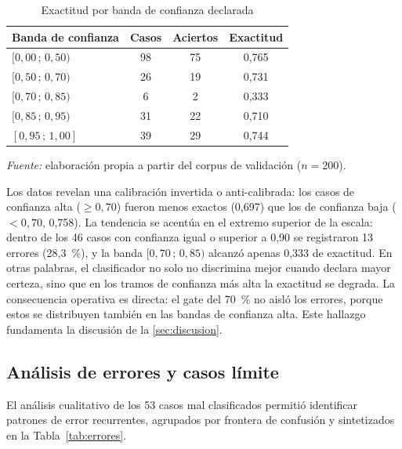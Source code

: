 \begin{table}[htbp]
\centering
\caption{Exactitud por banda de confianza declarada}
\label{tab:bandas}
\small
\begin{tabular}{@{}l c c c@{}}
\toprule
\textbf{Banda de confianza} & \textbf{Casos} & \textbf{Aciertos} & \textbf{Exactitud} \\
\midrule
\([0{,}00\,;\,0{,}50)\) & 98 & 75 & 0,765 \\
\([0{,}50\,;\,0{,}70)\) & 26 & 19 & 0,731 \\
\([0{,}70\,;\,0{,}85)\) & 6  & 2  & 0,333 \\
\([0{,}85\,;\,0{,}95)\) & 31 & 22 & 0,710 \\
\([0{,}95\,;\,1{,}00]\) & 39 & 29 & 0,744 \\
\bottomrule
\end{tabular}
\par\smallskip
{\footnotesize\textit{Fuente:} elaboración propia a partir del corpus de validación (\(n = 200\)).\par}
\end{table}

Los datos revelan una calibración invertida o anti-calibrada: los casos de confianza alta (\(\ge 0{,}70\)) fueron menos exactos (0,697) que los de confianza baja (\(< 0{,}70\), 0,758). La tendencia se acentúa en el extremo superior de la escala: dentro de los 46 casos con confianza igual o superior a 0,90 se registraron 13 errores (28,3~\%), y la banda \([0{,}70\,;\,0{,}85)\) alcanzó apenas 0,333 de exactitud. En otras palabras, el clasificador no solo no discrimina mejor cuando declara mayor certeza, sino que en los tramos de confianza más alta la exactitud se degrada. La consecuencia operativa es directa: el gate del 70~\% no aisló los errores, porque estos se distribuyen también en las bandas de confianza alta. Este hallazgo fundamenta la discusión de la \autoref{sec:discusion}.

\subsection{Análisis de errores y casos límite}\label{subsec:analisis-errores}

El análisis cualitativo de los 53 casos mal clasificados permitió identificar patrones de error recurrentes, agrupados por frontera de confusión y sintetizados en la Tabla~\ref{tab:errores}.


